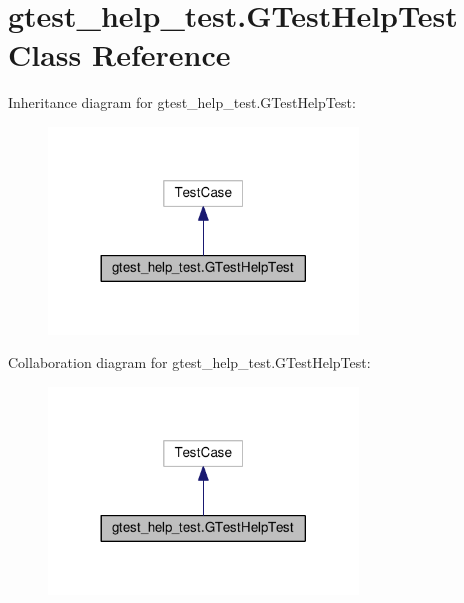 \hypertarget{classgtest__help__test_1_1GTestHelpTest}{}\section{gtest\+\_\+help\+\_\+test.\+G\+Test\+Help\+Test Class Reference}
\label{classgtest__help__test_1_1GTestHelpTest}


Inheritance diagram for gtest\+\_\+help\+\_\+test.\+G\+Test\+Help\+Test\+:
\nopagebreak
\begin{figure}[H]
\begin{center}
\leavevmode
\includegraphics[width=233pt]{classgtest__help__test_1_1GTestHelpTest__inherit__graph}
\end{center}
\end{figure}


Collaboration diagram for gtest\+\_\+help\+\_\+test.\+G\+Test\+Help\+Test\+:
\nopagebreak
\begin{figure}[H]
\begin{center}
\leavevmode
\includegraphics[width=233pt]{classgtest__help__test_1_1GTestHelpTest__coll__graph}
\end{center}
\end{figure}
